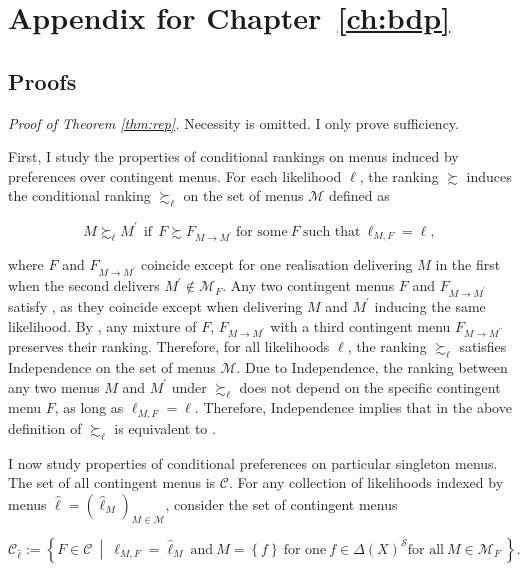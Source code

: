 \chapter{Appendix for Chapter \ref{ch:bdp}}
\label{app:bdp}

\section{Proofs}\label{app:proofsbdp}

\noindent \textit{Proof of Theorem \ref{thm:rep}.} Necessity is omitted. I only prove sufficiency.

First, I study the properties of conditional rankings on menus induced by preferences over contingent menus. For each likelihood \( \ell \), the ranking \(\succsim \) induces the conditional ranking \(\succsim_{\ell}\) on the set of menus \( \mathcal{M} \) defined as

\[
	M \succsim_{\ell} M^{\prime} \: \: \text{if} \: \: F \succsim F_{M \rightarrow M^{\prime}} \: \text{for some} \: F \: \text{such that} \: \ell_{M,F} = \ell,
\]

where \( F \) and \( F_{M \rightarrow M^{\prime}} \) coincide except for one realisation delivering \( M \) in the first when the second delivers \( M^{\prime} \notin \mathcal{M}_F \). Any two contingent menus \( F \) and \( F_{M \rightarrow M^{\prime}} \) satisfy , as they coincide except when delivering \(M\) and \(M^{\prime}\) inducing the same likelihood. By , any mixture of \( F \), \( F_{M \rightarrow M^{\prime}} \) with a third contingent menu \( F_{M \rightarrow M^{\prime \prime}} \) preserves their ranking. Therefore, for all likelihoods \( \ell \), the ranking \( \succsim_{\ell} \) satisfies Independence on the set of menus \(\mathcal{M}\). Due to Independence, the ranking between any two menus \( M \) and \( M^{\prime} \) under \( \succsim_{\ell} \) does not depend on the specific contingent menu \( F \), as long as \( \ell_{M, F}=\ell \). Therefore, Independence implies that  in the above definition of \( \succsim_{\ell} \) is equivalent to .

I now study properties of conditional preferences on particular singleton menus. The set of all contingent menus is \( \mathcal{C} \). For any collection of likelihoods indexed by menus \( \widehat{\ell} = \left( \widehat{\ell}_M \right)_{M \in \mathcal{M}} \), consider the set of contingent menus

\[
	\mathcal{C}_{\widehat{\ell}} := \left\{ F \in \mathcal{C} \: \middle\vert  \: \ell_{M,F} = \widehat{\ell}_{M} \: \text{and} \: M = \left\{ f \right\} \: \text{for one} \: f \in \Delta \left( X \right)^\mathcal{S} \text{for all} \: M \in \mathcal{M}_F \: \right\} .
\]

